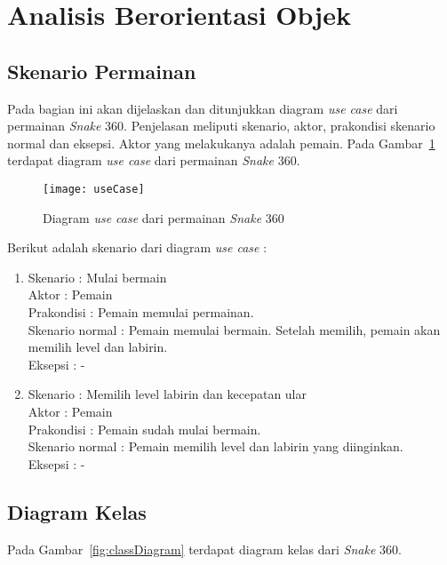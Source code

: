 \section{Analisis Berorientasi Objek}

\subsection{Skenario Permainan}
Pada bagian ini akan dijelaskan dan ditunjukkan diagram \textit{use case} dari permainan \textit{Snake} 360. Penjelasan meliputi skenario, aktor, prakondisi skenario normal dan eksepsi. Aktor yang melakukanya adalah pemain. Pada Gambar~\ref{fig:useCase} terdapat diagram \textit{use case} dari permainan \textit{Snake} 360.

\begin{figure}[H]
	\centering  
	\texttt{[image: useCase]}  
	\caption[Diagram \textit{use case} dari permainan \textit{Snake} 360]{Diagram \textit{use case} dari permainan \textit{Snake} 360}
	\label{fig:useCase} 
\end{figure}

Berikut adalah skenario dari diagram \textit{use case} :

\begin{enumerate}
	\item Skenario : Mulai bermain \\
Aktor : Pemain \\
Prakondisi : Pemain memulai permainan.\\
Skenario normal : Pemain memulai bermain. Setelah memilih, pemain akan memilih level dan labirin. \\
Eksepsi : - \\

	\item Skenario : Memilih level labirin dan kecepatan ular \\
Aktor : Pemain \\
Prakondisi : Pemain sudah mulai bermain. \\
Skenario normal : Pemain memilih level dan labirin yang diinginkan. \\ 
Eksepsi : - \\
\end{enumerate}

\subsection{Diagram Kelas}
Pada Gambar~\ref{fig:classDiagram} terdapat diagram kelas dari \textit{Snake} 360.

